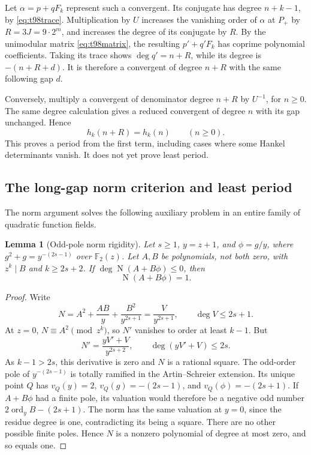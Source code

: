 \documentclass[11pt,a4paper]{article}
\newtheorem{lemma}[theorem]{Lemma}
\theoremstyle{definition}
\theoremstyle{remark}
\begin{document}
Let $\alpha=p+qF_k$ represent such a convergent. Its conjugate has
degree $n+k-1$, by \eqref{eq:t98trace}. Multiplication by $U$ increases
the vanishing order of $\alpha$ at $P_+$ by
$R=3J=9\cdot2^m$, and increases the degree of its conjugate by $R$.
By the unimodular matrix \eqref{eq:t98matrix}, the resulting
$p'+q'F_k$ has coprime polynomial coefficients. Taking its trace shows
$\deg q'=n+R$, while its degree is $-(n+R+d)$. It is therefore a
convergent of degree $n+R$ with the same following gap $d$.

Conversely, multiply a convergent of denominator degree $n+R$ by
$U^{-1}$, for $n\ge0$. The same degree calculation gives a reduced
convergent of degree $n$ with its gap unchanged. Hence
\[
                   h_k(n+R)=h_k(n)\qquad(n\ge0).
\]
This proves a period from the first term, including cases where some
Hankel determinants vanish. It does not yet prove least period.

\subsection{The long-gap norm criterion and least period}

The norm argument solves the following auxiliary problem in an entire
family of quadratic function fields.

\begin{lemma}[Odd-pole norm rigidity]\label{lem:t98rigidity}
Let $s\ge1$, $y=z+1$, and $\phi=g/y$, where
$g^2+g=y^{-(2s-1)}$ over $\mathbb F_2(z)$. Let $A,B$ be polynomials,
not both zero, with $z^k\mid B$ and $k\ge2s+2$. If
$\deg\operatorname{N}(A+B\phi)\le0$, then
\[
                         \operatorname{N}(A+B\phi)=1.
\]
\end{lemma}
\begin{proof}
Write
\[
 N=A^2+\frac{AB}{y}+\frac{B^2}{y^{2s+1}}
    =\frac{V}{y^{2s+1}},\qquad\deg V\le2s+1.
\]
At $z=0$, $N\equiv A^2\pmod{z^k}$, so $N'$ vanishes to order
at least $k-1$. But
\[
 N'=\frac{yV'+V}{y^{2s+2}},\qquad\deg(yV'+V)\le2s.
\]
As $k-1>2s$, this derivative is zero and $N$ is a rational square.
The odd-order pole of $y^{-(2s-1)}$ is totally ramified in the
Artin--Schreier extension. Its unique point $Q$ has
$v_Q(y)=2$, $v_Q(g)=-(2s-1)$, and $v_Q(\phi)=-(2s+1)$.
If $A+B\phi$ had a finite pole, its valuation would therefore be a
negative odd number $2\operatorname{ord}_yB-(2s+1)$.
The norm has the same valuation at $y=0$, since the residue degree
is one, contradicting its being a square. There are no other possible
finite poles. Hence $N$ is a nonzero polynomial of degree at most zero,
and so equals one.
\end{proof}
\end{document}
